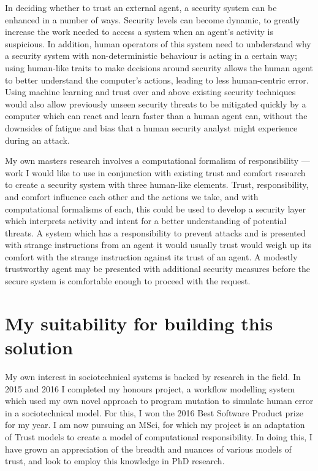 \documentclass{tufte-handout}
\begin{document}
In deciding whether to trust an external agent, a security system can be enhanced in a number of ways. Security levels can become dynamic, to greatly increase the work needed to access a system when an agent's activity is suspicious. In addition, human operators of this system need to unbderstand why a security system with non-deterministic behaviour is acting in a certain way; using human-like traits to make decisions around security allows the human agent to better understand the computer's actions, leading to less human-centric error. Using machine learning and trust over and above existing security techniques would also allow previously unseen security threats to be mitigated quickly by a computer which can react and learn faster than a human agent can, without the downsides of fatigue and bias that a human security analyst might experience during an attack.\par

My own masters research involves a computational formalism of responsibility --- work I would like to use in conjunction with existing trust and comfort research to create a security system with three human-like elements. Trust, responsibility, and comfort influence each other and the actions we take, and with computational formalisms of each, this could be used to develop a security layer which interprets activity and intent for a better understanding of potential threats. A system which has a responsibility to prevent attacks and is presented with strange instructions from an agent it would usually trust would weigh up its comfort with the strange instruction against its trust of an agent. A modestly trustworthy agent may be presented with additional security measures before the secure system is comfortable enough to proceed with the request.\par

\section{My suitability for building this solution}
My own interest in sociotechnical systems is backed by research in the field. In 2015 and 2016 I completed my honours project, a workflow modelling system which used my own novel approach to program mutation to simulate human error in a sociotechnical model. For this, I won the 2016 Best Software Product prize for my year. I am now pursuing an MSci, for which my project is an adaptation of Trust models to create a model of computational responsibility. In doing this, I have grown an appreciation of the breadth and nuances of various models of trust, and look to employ this knowledge in PhD research.\par
\end{document}
